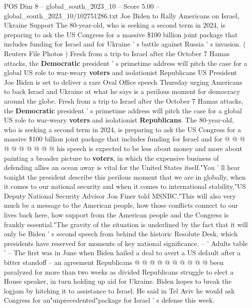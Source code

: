 \begin{textsample}{POS Dim 8 – global\_south\_2023\_10 – Score 5.00 – global\_south\_2023\_10/102751286.txt}  \label{ex:f8_pos_366}
Joe Biden to Rally Americans on Israel, Ukraine Support The 80-year-old, who is seeking a second term in 2024, is preparing to ask the US Congress for a massive \$100 billion joint package that includes funding for Israel and for Ukraine ' s battle against Russia ' s invasion. ( Reuters File Photos ) Fresh from a trip to Israel after the October 7 Hamas attacks, the \textbf{Democratic} president ' s primetime address will pitch the case for a global US role to war-weary \textbf{voters} and isolationist Republicans US President Joe Biden is set to deliver a rare Oval Office speech Thursday urging Americans to back Israel and Ukraine at what he says is a perilous moment for democracy around the globe.
Fresh from a trip to Israel after the October 7 Hamas attacks, the \textbf{Democratic} president ' s primetime address will pitch the case for a global US role to war-weary \textbf{voters} and isolationist \textbf{Republicans}.
The 80-year-old, who is seeking a second term in 2024, is preparing to ask the US Congress for a massive \$100 billion joint package that includes funding for Israel and for @ @ @ @ @ @ @ @ @ @ his speech is expected to be less about money and more about painting a broader picture to \textbf{voters}, in which the expensive business of defending allies an ocean away is vital for the United States itself."You ' ll hear tonight the president describe this perilous moment that we are in globally, when it comes to our national security and when it comes to international stability,"US Deputy National Security Advisor Jon Finer told MSNBC."This will also very much be a message to the American people, how those conflicts connect to our lives back here, how support from the American people and the Congress is frankly essential."The gravity of the situation is underlined by the fact that it will only be Biden ' s second speech from behind the historic Resolute Desk, which presidents have reserved for moments of key national significance. -- ' Adults table ' -- The first was in June when Biden hailed a deal to avert a US default after a bitter standoff -- an agreement Republicans @ @ @ @ @ @ @ @ @ @ been paralyzed for more than two weeks as divided Republicans struggle to elect a House speaker, in turn holding up aid for Ukraine.
Biden hopes to break the logjam by hitching it to assistance to Israel.
He said in Tel Aviv he would ask Congress for an"unprecedented"package for Israel ' s defense this week.

\end{textsample}
